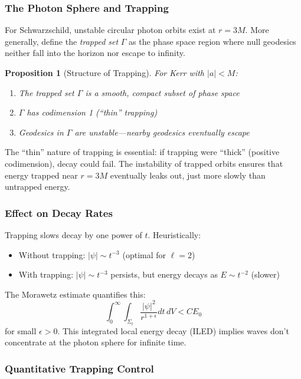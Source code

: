 \documentclass[12pt,a4paper]{article}
\newtheorem{proposition}[theorem]{Proposition}
\begin{document}
\subsubsection{The Photon Sphere and Trapping}

For Schwarzschild, unstable circular photon orbits exist at $r = 3M$. More generally, define the \textit{trapped set} $\Gamma$ as the phase space region where null geodesics neither fall into the horizon nor escape to infinity.

\begin{proposition}[Structure of Trapping]
For Kerr with $|a| < M$:
\begin{enumerate}
    \item The trapped set $\Gamma$ is a smooth, compact subset of phase space
    \item $\Gamma$ has codimension 1 (``thin'' trapping)
    \item Geodesics in $\Gamma$ are unstable---nearby geodesics eventually escape
\end{enumerate}
\end{proposition}

The ``thin'' nature of trapping is essential: if trapping were ``thick'' (positive codimension), decay could fail. The instability of trapped orbits ensures that energy trapped near $r = 3M$ eventually leaks out, just more slowly than untrapped energy.

\subsubsection{Effect on Decay Rates}

Trapping slows decay by one power of $t$. Heuristically:
\begin{itemize}
    \item Without trapping: $|\psi| \sim t^{-3}$ (optimal for $\ell = 2$)
    \item With trapping: $|\psi| \sim t^{-3}$ persists, but energy decays as $E \sim t^{-2}$ (slower)
\end{itemize}

The Morawetz estimate quantifies this:
\begin{equation}
\int_0^\infty \int_{\Sigma_t} \frac{|\psi|^2}{r^{1+\epsilon}} dt\, dV < C E_0
\end{equation}
for small $\epsilon > 0$. This integrated local energy decay (ILED) implies waves don't concentrate at the photon sphere for infinite time.

\subsubsection{Quantitative Trapping Control}
\end{document}
